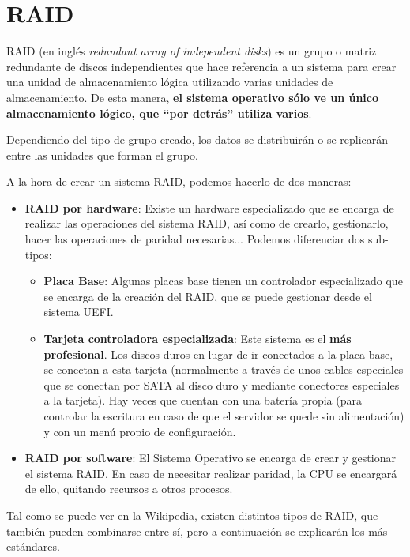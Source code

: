 \section{RAID}

RAID (en inglés \textit{redundant array of independent disks}) es un grupo o matriz redundante de discos independientes que hace referencia a un sistema para crear una unidad de almacenamiento lógica utilizando varias unidades de almacenamiento. De esta manera, \textbf{el sistema operativo sólo ve un único almacenamiento lógico, que “por detrás” utiliza varios}.

Dependiendo del tipo de grupo creado, los datos se distribuirán o se replicarán entre las unidades que forman el grupo.

A la hora de crear un sistema RAID, podemos hacerlo de dos maneras:
\begin{itemize}
    \item \textbf{RAID por hardware}: Existe un hardware especializado que se encarga de realizar las operaciones del sistema RAID, así como de crearlo, gestionarlo, hacer las operaciones de paridad necesarias... Podemos diferenciar dos sub-tipos:

    \begin{itemize}
        \item \textbf{Placa Base}: Algunas placas base tienen un controlador especializado que se encarga de la creación del RAID, que se puede gestionar desde el sistema UEFI.
        \item \textbf{Tarjeta controladora especializada}: Este sistema es el \textbf{más profesional}. Los discos duros en lugar de ir conectados a la placa base, se conectan a esta tarjeta (normalmente a través de unos cables especiales que se conectan por SATA al disco duro y mediante conectores especiales a la tarjeta). Hay veces que cuentan con una batería propia (para controlar la escritura en caso de que el servidor se quede sin alimentación) y con un menú propio de configuración.
    \end{itemize}

    \item \textbf{RAID por software}: El Sistema Operativo se encarga de crear y gestionar el sistema RAID. En caso de necesitar realizar paridad, la CPU se encargará de ello, quitando recursos a otros procesos.
\end{itemize}

Tal como se puede ver en la \href{https://es.wikipedia.org/wiki/RAID}{Wikipedia}, existen distintos tipos de RAID, que también pueden combinarse entre sí, pero a continuación se explicarán los más estándares.

